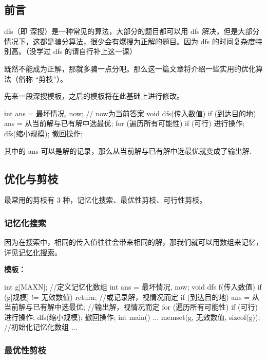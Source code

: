 
\subsection{前言}

dfs（即 深搜）是一种常见的算法，大部分的题目都可以用 dfs 解决，但是大部分情况下，这都是骗分算法，很少会有爆搜为正解的题目。因为 dfs 的时间复杂度特别高。（没学过 dfs 的请自行补上这一课）

既然不能成为正解，那就多骗一点分吧。那么这一篇文章将介绍一些实用的优化算法（俗称 “剪枝”）。

先来一段深搜模板，之后的模板将在此基础上进行修改。

\begin{cppcode}
int ans = 最坏情况, now;  // now为当前答案
void dfs(传入数值) {
  if (到达目的地) ans = 从当前解与已有解中选最优;
  for (遍历所有可能性)
    if (可行) {
      进行操作;
      dfs(缩小规模);
      撤回操作;
    }
}
\end{cppcode}

其中的 ans 可以是解的记录，那么从当前解与已有解中选最优就变成了输出解.

\subsection{优化与剪枝}

最常用的剪枝有 3 种，记忆化搜索、最优性剪枝、可行性剪枝。

\subsubsection{记忆化搜索}

因为在搜索中，相同的传入值往往会带来相同的解，那我们就可以用数组来记忆，详见\href{/dp/memo/}{记忆化搜索}。

\textbf{模板：}

\begin{cppcode}
int g[MAXN];  //定义记忆化数组
int ans = 最坏情况, now;
void dfs f(传入数值) {
  if (g[规模] != 无效数值) return;  //或记录解，视情况而定
  if (到达目的地) ans = 从当前解与已有解中选最优;  //输出解，视情况而定
  for (遍历所有可能性)
    if (可行) {
      进行操作;
      dfs(缩小规模);
      撤回操作;
    }
}
int main() {
  ... memset(g, 无效数值, sizeof(g));  //初始化记忆化数组
  ...
}
\end{cppcode}

\subsubsection{最优性剪枝}

